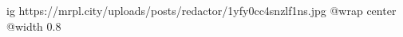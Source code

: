  
 
 
 
 

\ifcmt
  ig https://mrpl.city/uploads/posts/redactor/1yfy0cc4snzlf1ns.jpg
  @wrap center
  @width 0.8
\fi
